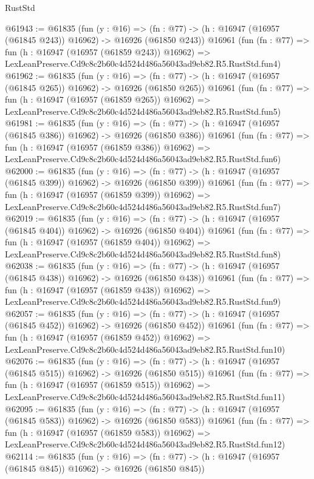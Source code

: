 \begin{lexlean}{RustStd}
\begin{coremodule}
@61943 := @61835
    (fun (y : @16) =>
    (fn : @77) -> (h : @16947 (@16957 (@61845 @243)) @16962) -> @16926 (@61850 @243))
    @16961
    (fun (fn : @77) =>
    fun (h : @16947 (@16957 (@61859 @243)) @16962) =>
    LexLeanPreserve.Cd9c8c2b60c4d524d486a56043ad9eb82.R5.RustStd.fun4)
@61962 := @61835
    (fun (y : @16) =>
    (fn : @77) -> (h : @16947 (@16957 (@61845 @265)) @16962) -> @16926 (@61850 @265))
    @16961
    (fun (fn : @77) =>
    fun (h : @16947 (@16957 (@61859 @265)) @16962) =>
    LexLeanPreserve.Cd9c8c2b60c4d524d486a56043ad9eb82.R5.RustStd.fun5)
@61981 := @61835
    (fun (y : @16) =>
    (fn : @77) -> (h : @16947 (@16957 (@61845 @386)) @16962) -> @16926 (@61850 @386))
    @16961
    (fun (fn : @77) =>
    fun (h : @16947 (@16957 (@61859 @386)) @16962) =>
    LexLeanPreserve.Cd9c8c2b60c4d524d486a56043ad9eb82.R5.RustStd.fun6)
@62000 := @61835
    (fun (y : @16) =>
    (fn : @77) -> (h : @16947 (@16957 (@61845 @399)) @16962) -> @16926 (@61850 @399))
    @16961
    (fun (fn : @77) =>
    fun (h : @16947 (@16957 (@61859 @399)) @16962) =>
    LexLeanPreserve.Cd9c8c2b60c4d524d486a56043ad9eb82.R5.RustStd.fun7)
@62019 := @61835
    (fun (y : @16) =>
    (fn : @77) -> (h : @16947 (@16957 (@61845 @404)) @16962) -> @16926 (@61850 @404))
    @16961
    (fun (fn : @77) =>
    fun (h : @16947 (@16957 (@61859 @404)) @16962) =>
    LexLeanPreserve.Cd9c8c2b60c4d524d486a56043ad9eb82.R5.RustStd.fun8)
@62038 := @61835
    (fun (y : @16) =>
    (fn : @77) -> (h : @16947 (@16957 (@61845 @438)) @16962) -> @16926 (@61850 @438))
    @16961
    (fun (fn : @77) =>
    fun (h : @16947 (@16957 (@61859 @438)) @16962) =>
    LexLeanPreserve.Cd9c8c2b60c4d524d486a56043ad9eb82.R5.RustStd.fun9)
@62057 := @61835
    (fun (y : @16) =>
    (fn : @77) -> (h : @16947 (@16957 (@61845 @452)) @16962) -> @16926 (@61850 @452))
    @16961
    (fun (fn : @77) =>
    fun (h : @16947 (@16957 (@61859 @452)) @16962) =>
    LexLeanPreserve.Cd9c8c2b60c4d524d486a56043ad9eb82.R5.RustStd.fun10)
@62076 := @61835
    (fun (y : @16) =>
    (fn : @77) -> (h : @16947 (@16957 (@61845 @515)) @16962) -> @16926 (@61850 @515))
    @16961
    (fun (fn : @77) =>
    fun (h : @16947 (@16957 (@61859 @515)) @16962) =>
    LexLeanPreserve.Cd9c8c2b60c4d524d486a56043ad9eb82.R5.RustStd.fun11)
@62095 := @61835
    (fun (y : @16) =>
    (fn : @77) -> (h : @16947 (@16957 (@61845 @583)) @16962) -> @16926 (@61850 @583))
    @16961
    (fun (fn : @77) =>
    fun (h : @16947 (@16957 (@61859 @583)) @16962) =>
    LexLeanPreserve.Cd9c8c2b60c4d524d486a56043ad9eb82.R5.RustStd.fun12)
@62114 := @61835
    (fun (y : @16) =>
    (fn : @77) -> (h : @16947 (@16957 (@61845 @845)) @16962) -> @16926 (@61850 @845))

\end{coremodule}
\end{lexlean}

